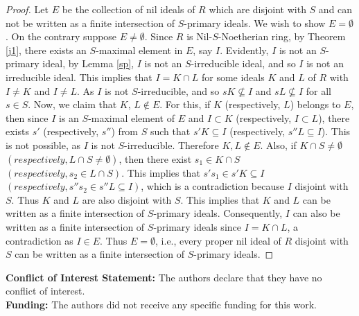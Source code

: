 \documentclass[11pt]{article}
\begin{document}
\begin{proof}
	\noindent
	Let $E$ be the collection of nil ideals of $R$ which are disjoint with $S$ and can not be written as a finite intersection of $S$-primary ideals. We wish to show $E=\emptyset$. On the contrary suppose  $E\neq\emptyset$.  Since $R$ is Nil-$S$-Noetherian ring, by Theorem \ref{j1}, there exists an $S$-maximal element in $E$, say $I$. Evidently, $I$ is not an $S$-primary ideal, by Lemma \ref{sp}, $I$ is not an $S$-irreducible ideal, and so  $I$ is not an irreducible ideal. This implies that  $I=K\cap L$ for some ideals $K$ and $L$ of $R$ with $I\neq K$ and $I\neq L$. As $I$ is not $S$-irreducible, and so $sK\nsubseteq I$ and $sL\nsubseteq I$ for all $s\in S$. Now, we claim that $K$, $L\notin E$. For this, if $K$ (respectively, $L$) belongs to $E$, then since $I$ is an $S$-maximal element of $E$ and $I\subset K$ (respectively, $I\subset L$), there exists $s'$ (respectively, $s''$) from $S$ such that $s'K\subseteq I$ (respectively, $s''L\subseteq I$). This is not possible, as $I$ is not $S$-irreducible. Therefore $K, L\notin E$. Also, if $K\cap S\neq\emptyset$ $(respectively, L\cap S\neq\emptyset)$, then there exist $s_{1}\in K\cap S$  $(respectively, s_{2}\in L\cap S)$. This implies that $s's_{1}\in s'K\subseteq I$ $(respectively, s''s_{2}\in s''L\subseteq I)$, which is a contradiction because $I$ disjoint with $S$. Thus $K$ and $L$ are also disjoint with $S$. This implies that $K$ and $L$ can be written as a finite intersection of $S$-primary ideals. Consequently, $I$ can also be written as a finite intersection of $S$-primary ideals since  $I=K\cap L$, a contradiction as $I\in E$. Thus $E=\emptyset$, i.e., every proper nil ideal of $R$ disjoint with $S$ can be written as a finite intersection of $S$-primary ideals. 
\end{proof}
\noindent
\textbf{Conflict of Interest Statement:} The authors declare that they have no conflict of interest.\\
\textbf{Funding:} The authors did not receive any specific funding for this work.
\end{document}
